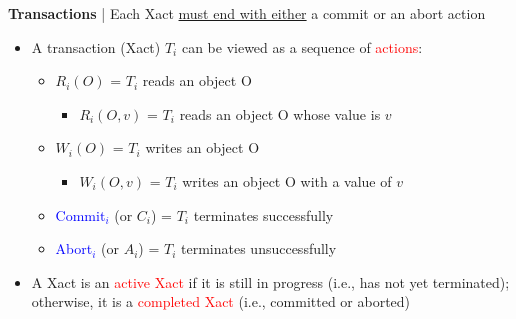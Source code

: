 \documentclass[10pt,landscape]{article}
\newcommand{\1}{\mathmybb{1}}
\begin{document}
\begin{multicols*}{3}
\textbf{Transactions} | Each Xact \underline{must end with either} a commit or an abort action
\begin{itemize}
    \item A transaction (Xact) $T_i$ can be viewed as a sequence of \textcolor{red}{actions}:
    \begin{itemize}
        \item $R_i(O)$ = $T_i$ reads an object O
        \begin{itemize}
            \item $R_i(O, v)$ = $T_i$ reads an object O whose value is $v$
        \end{itemize}
        \item $W_i(O)$ = $T_i$ writes an object O
        \begin{itemize}
            \item $W_i(O, v)$ = $T_i$ writes an object O with a value of $v$
        \end{itemize}
        \item \textcolor{blue}{Commit$_i$} (or $C_i$) = $T_i$ terminates successfully
        \item \textcolor{blue}{Abort$_i$} (or $A_i$) = $T_i$ terminates unsuccessfully
    \end{itemize}
    \item A Xact is an \textcolor{red}{active Xact} if it is still in progress (i.e., has not yet terminated); otherwise, it is a \textcolor{red}{completed Xact} (i.e., committed or aborted)
\end{itemize}


\end{multicols*}
\end{document}

